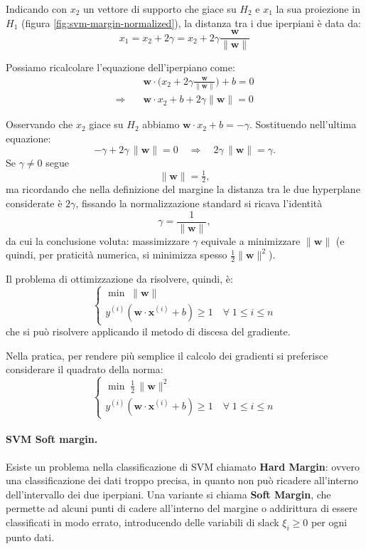Indicando con $x_2$ un vettore di supporto che giace su $H_2$ e $x_1$ la sua proiezione in $H_1$ (figura \ref{fig:svm-margin-normalized}), la distanza tra i due iperpiani è data da:
\[
x_1 = x_2 + 2 \gamma = x_2 + 2 \gamma \frac{\mathbf{w}}{\|\mathbf{w}\|}
\]

\noindent
Possiamo ricalcolare l'equazione dell'iperpiano come:
\begin{align*}
&\mathbf{w}\cdot\bigl(x_2 + 2\gamma \frac{\mathbf{w}}{\|\mathbf{w}\|}\bigr) + b = 0 \\
\Rightarrow\quad &\mathbf{w}\cdot x_2 + b + 2\gamma \|\mathbf{w}\| = 0
\end{align*}

Osservando che $x_2$ giace su $H_2$ abbiamo $\mathbf{w}\cdot x_2 + b = -\gamma$. Sostituendo nell'ultima equazione:
\[
-\gamma + 2\gamma\,\|\mathbf{w}\| = 0 \quad\Longrightarrow\quad 2\gamma\,\|\mathbf{w}\| = \gamma.
\]
Se $\gamma\neq 0$ segue
\[
\|\mathbf{w}\| = \tfrac{1}{2},
\]
ma ricordando che nella definizione del margine la distanza tra le due hyperplane considerate è $2\gamma$, fissando la normalizzazione standard si ricava l'identità
\[
\gamma = \frac{1}{\|\mathbf{w}\|},
\]
da cui la conclusione voluta: massimizzare $\gamma$ equivale a minimizzare $\|\mathbf{w}\|$ (e quindi, per praticità numerica, si minimizza spesso $\tfrac{1}{2}\|\mathbf{w}\|^2$).

Il problema di ottimizzazione da risolvere, quindi, è:
\[
\begin{cases}
\displaystyle\min\;\|\mathbf{w}\|\\[6pt]
	y^{(i)}(\mathbf{w}\cdot\mathbf{x}^{(i)}+b)\ge 1\quad\forall\;1\le i\le n
\end{cases}
\]
che si può risolvere applicando il metodo di discesa del gradiente.

Nella pratica, per rendere più semplice il calcolo dei gradienti si preferisce considerare il quadrato della norma:
\[
\begin{cases}
\displaystyle\min\;\tfrac{1}{2}\,\|\mathbf{w}\|^2\\[6pt]
	y^{(i)}(\mathbf{w}\cdot\mathbf{x}^{(i)}+b)\ge 1\quad\forall\;1\le i\le n
\end{cases}
\]

\paragraph{SVM Soft margin.} Esiste un problema nella classificazione di SVM chiamato \textbf{Hard Margin}: ovvero una classificazione dei dati troppo precisa, in quanto non può ricadere all'interno dell'intervallo dei due iperpiani. Una variante si chiama \textbf{Soft Margin}, che permette ad alcuni punti di cadere all'interno del margine o addirittura di essere classificati in modo errato, introducendo delle variabili di slack $\xi_i\ge 0$ per ogni punto dati. 


